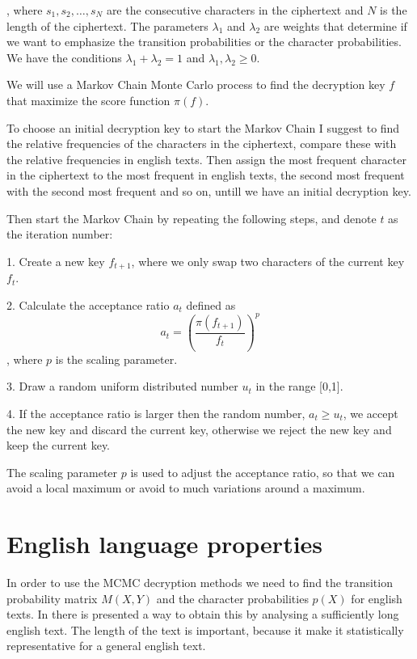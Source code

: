 \documentclass[a4paper, 11pt]{article}
\begin{document}
, where $s_1,s_2,\dots,s_N$ are the consecutive characters in the ciphertext
and $N$ is the length of the ciphertext. The parameters $\lambda_1$ and 
$\lambda_2$ are weights that determine if we want to emphasize the
transition probabilities or the character probabilities. We have the conditions
$\lambda_1 + \lambda_2 = 1$ and $\lambda_1, \lambda_2 \geq 0$.

We will use a Markov Chain Monte Carlo process to find the decryption key
$f$ that maximize the score function $\pi(f)$.

To choose an initial decryption key to start the Markov Chain I suggest to
find the relative frequencies of the characters in the ciphertext, compare 
these with the relative frequencies in english texts. Then assign the most
frequent character in the ciphertext to the most frequent in english texts, 
the second most frequent with the second most frequent and so on, untill
we have an initial decryption key.

Then start the Markov Chain by repeating the following steps, and denote
$t$ as the iteration number:

1. Create a new key $f_{t+1}$, where we only swap two characters of 
the current key $f_t$.

2. Calculate the acceptance ratio $a_t$ defined as
\[
  a_t = \left( \frac{\pi(f_{t+1})}{f_{t}} \right)^p
\]
, where $p$ is the scaling parameter.

3. Draw a random uniform distributed number $u_t$ in the range [0,1].

4. If the acceptance ratio is larger then the random number, $a_t \geq u_t$,
we accept the new key and discard the current key, otherwise we reject
the new key and keep the current key.

The scaling parameter $p$ is used to adjust the acceptance ratio, so that
we can avoid a local maximum or avoid to much variations around a maximum.

\section{English language properties}

In order to use the MCMC decryption methods we need to find the transition
probability matrix $M(X,Y)$ and the character probabilities $p(X)$ for
english texts. In \cite{Landgraf} there is presented a way to obtain this by
analysing a sufficiently long english text. The length of the text is
important, because it make it statistically representative for a general
english text. 
\end{document}
